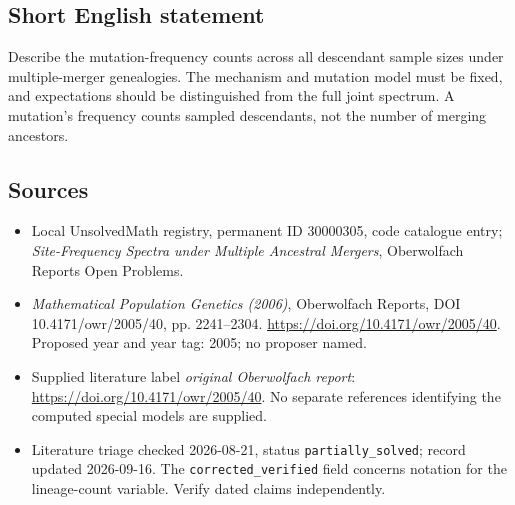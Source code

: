 \documentclass[11pt]{article}
\begin{document}
\subsection{Short English statement}
Describe the mutation-frequency counts across all descendant sample sizes under multiple-merger genealogies. The mechanism and mutation model must be fixed, and expectations should be distinguished from the full joint spectrum. A mutation's frequency counts sampled descendants, not the number of merging ancestors.
\subsection{Sources}
\begin{itemize}\item Local UnsolvedMath registry, permanent ID 30000305, code catalogue entry; \emph{Site-Frequency Spectra under Multiple Ancestral Mergers}, Oberwolfach Reports Open Problems.\item \emph{Mathematical Population Genetics (2006)}, Oberwolfach Reports, DOI 10.4171/owr/2005/40, pp. 2241--2304. \url{https://doi.org/10.4171/owr/2005/40}. Proposed year and year tag: 2005; no proposer named.\item Supplied literature label \emph{original Oberwolfach report}: \url{https://doi.org/10.4171/owr/2005/40}. No separate references identifying the computed special models are supplied.\item Literature triage checked 2026-08-21, status \texttt{partially\_solved}; record updated 2026-09-16. The \texttt{corrected\_verified} field concerns notation for the lineage-count variable. Verify dated claims independently.\end{itemize}
\end{document}
